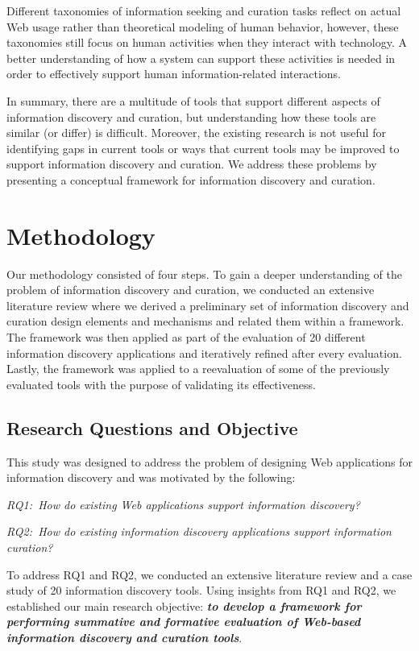 \documentclass[review]{elsarticle}
\begin{document}
Different taxonomies of information seeking and curation tasks reflect on actual Web usage rather than theoretical modeling of human behavior, however, these taxonomies still focus on human activities when they interact with technology. A better understanding of how a system can support these activities is needed in order to effectively support human information-related interactions. 

In summary, there are a multitude of tools that support different aspects of information discovery and curation, but understanding how these tools are similar (or differ) is difficult. Moreover, the existing research is not useful for identifying gaps in current tools or ways that current tools may be improved to support information discovery and curation. We address these problems by presenting a conceptual framework for information discovery and curation.

\section{Methodology}
\label{section:methodology}
Our methodology consisted of four steps. To gain a deeper understanding of the problem of information discovery and curation, we conducted an extensive literature review where we derived a preliminary set of information discovery and curation design elements and mechanisms and related them within a framework. The framework was then applied as part of the evaluation of 20 different information discovery applications and iteratively refined after every evaluation. Lastly, the framework was applied to a reevaluation of some of the previously evaluated tools with the purpose of validating its effectiveness. 

{\subsection{Research Questions and Objective}
This study was designed to address the problem of designing Web applications for information discovery and was motivated by the following:

\emph{RQ1:~How do existing Web applications support information discovery?}

\emph{RQ2:~How do existing information discovery applications support information curation?}

To address RQ1 and RQ2, we conducted an extensive literature review and a case study of 20 information discovery tools. Using insights from RQ1 and RQ2, we established our main research objective: \emph{\textbf{to develop a framework for performing summative and formative evaluation of Web-based information discovery and curation tools}}.

}%
\end{document}
